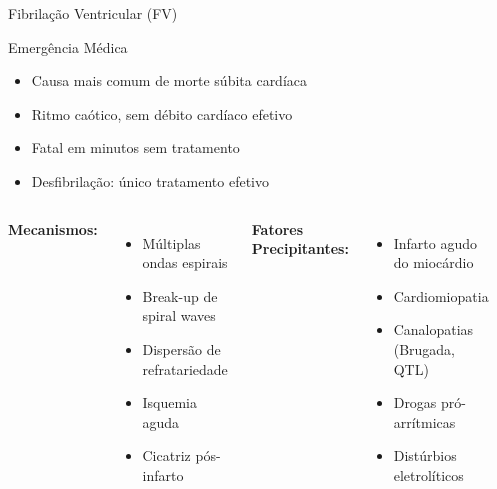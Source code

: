 \begin{frame}{Fibrilação Ventricular (FV)}
\begin{block}{Emergência Médica}
\begin{itemize}
    \item Causa mais comum de morte súbita cardíaca
    \item Ritmo caótico, sem débito cardíaco efetivo
    \item Fatal em minutos sem tratamento
    \item Desfibrilação: único tratamento efetivo
\end{itemize}
\end{block}

\vspace{0.3cm}

\begin{columns}
\textbf{Mecanismos:}
\begin{itemize}
    \item Múltiplas ondas espirais
    \item Break-up de spiral waves
    \item Dispersão de refratariedade
    \item Isquemia aguda
    \item Cicatriz pós-infarto
\end{itemize}

\vspace{0.3cm}

\textbf{Fatores Precipitantes:}
\begin{itemize}
    \item Infarto agudo do miocárdio
    \item Cardiomiopatia
    \item Canalopatias (Brugada, QTL)
    \item Drogas pró-arrítmicas
    \item Distúrbios eletrolíticos
\end{itemize}

\begin{center}
\end{center}
\end{columns}
\end{frame}

